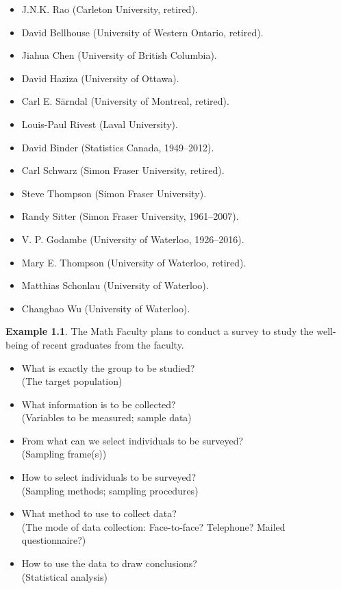 \documentclass[oneside]{book}\usepackage[]{graphicx}\usepackage[svgnames]{xcolor}
\begin{document}
\begin{itemize}
      \item J.N.K. Rao (Carleton University, retired).
      \item David Bellhouse (University of Western Ontario, retired).
      \item Jiahua Chen (University of British Columbia).
      \item David Haziza (University of Ottawa).
      \item Carl E. Särndal (University of Montreal, retired).
      \item Louis-Paul Rivest (Laval University).
      \item David Binder (Statistics Canada, 1949--2012).
      \item Carl Schwarz (Simon Fraser University, retired).
      \item Steve Thompson (Simon Fraser University).
      \item Randy Sitter (Simon Fraser University, 1961--2007).
      \item V. P. Godambe (University of Waterloo, 1926--2016).
      \item Mary E. Thompson (University of Waterloo, retired).
      \item Matthias Schonlau (University of Waterloo).
      \item Changbao Wu (University of Waterloo).
\end{itemize}
\begin{Example}{}
      \textbf{Example 1.1}. The Math Faculty plans to conduct a survey to study
      the well-being of recent graduates from the faculty.
      \begin{itemize}
            \item What is exactly the group to be studied?\\
                  (The target population)
            \item What information is to be collected?\\
                  (Variables to be measured; sample data)
            \item From what can we select individuals to be surveyed?\\
                  (Sampling frame(s))
            \item How to select individuals to be surveyed?\\
                  (Sampling methods; sampling procedures)
            \item What method to use to collect data?\\
                  (The mode of data collection: Face-to-face? Telephone? Mailed
                  questionnaire?)
            \item How to use the data to draw conclusions?\\
                  (Statistical analysis)
      \end{itemize}
\end{Example}
\end{document}
